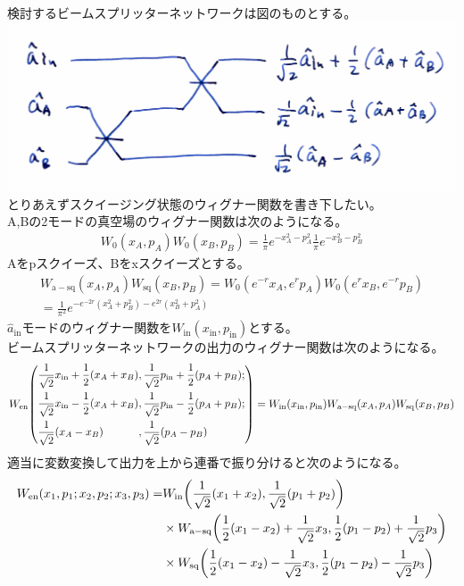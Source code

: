 \documentclass{jsarticle}
\newcommand{\mr}[1]{\mathrm{#1}}
\begin{document}
検討するビームスプリッターネットワークは図のものとする。\\
\includegraphics[width=1\linewidth]{./graphics/BSnet.pdf}
とりあえずスクイージング状態のウィグナー関数を書き下したい。\\
A,Bの2モードの真空場のウィグナー関数は次のようになる。
\begin{gather*}
	W_0(x_A,p_A)W_0(x_B,p_B)
	=
	\frac{1}{\pi}
	e^{-x_A^2-p_A^2}
	\frac{1}{\pi}
	e^{-x_B^2-p_B^2}
\end{gather*}
Aをpスクイーズ、Bをxスクイーズとする。
\begin{gather*}
	W_\mr{a-sq}(x_A,p_A)
	W_\mr{sq}(x_B,p_B)
	=
	W_0(e^{-r} x_A,e^r p_A)W_0(e^r x_B,e^{-r} p_B)\\
	= \frac{1}{\pi^2} e^{ -e^{-2r}(x_A^2 + p_B^2) - e^{2r}(x_B^2 + p_A^2)}
\end{gather*}
$\hat{a}_\mr{in}$モードのウィグナー関数を$W_\mr{in}(x_\mr{in},p_\mr{in})$とする。\\
ビームスプリッターネットワークの出力のウィグナー関数は次のようになる。
\begin{gather*}
	W_\mr{en} \qty(
		\begin{alignedat}{2}
			&\frac{1}{\sqrt{2}} x_\mr{in} + \frac{1}{2}(x_A+x_B)&	&,\frac{1}{\sqrt{2}} p_\mr{in} + \frac{1}{2}(p_A+p_B);\\
			&\frac{1}{\sqrt{2}} x_\mr{in} - \frac{1}{2}(x_A+x_B)&	&,\frac{1}{\sqrt{2}} p_\mr{in} - \frac{1}{2}(p_A+p_B);\\
			&\frac{1}{\sqrt{2}} (x_A - x_B)						&	&,\frac{1}{\sqrt{2}} (p_A - p_B)
		\end{alignedat}
	)
	=
	W_\mr{in}(x_\mr{in},p_\mr{in})
	W_\mr{a-sq}(x_A,p_A)
	W_\mr{sq}(x_B,p_B)
\end{gather*}
適当に変数変換して出力を上から連番で振り分けると次のようになる。
\begin{align*}
	W_\mr{en}(x_1,p_1;x_2,p_2;x_3,p_3)
	=&
	W_\mr{in} \qty( \frac{1}{\sqrt{2}} (x_1+x_2), \frac{1}{\sqrt{2}} (p_1+p_2) )\\
	& \times W_\mr{a-sq} \qty( \frac{1}{2} (x_1-x_2) + \frac{1}{\sqrt{2}} x_3, \frac{1}{2} (p_1-p_2) + \frac{1}{\sqrt{2}} p_3)\\
	& \times W_\mr{sq} \qty( \frac{1}{2} (x_1-x_2) - \frac{1}{\sqrt{2}} x_3, \frac{1}{2} (p_1-p_2) - \frac{1}{\sqrt{2}} p_3 )
\end{align*}
\end{document}
